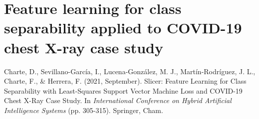 \documentclass[
	fontsize=11pt, %
	twoside=false, %
	open=any, %
	secnumdepth=1, %
]{kaobook}
\begin{document}
%
\renewcommand*{\thechapter}{\Roman{chapter}}
\addtocounter{chapter}{6}
\chapter{Feature learning for class separability applied to COVID-19 chest X-ray case study}

\begin{widepar}
  \begin{kaobox}[frametitle=Source]
    Charte, D., Sevillano-García, I., Lucena-González, M. J., Martín-Rodríguez, J. L., Charte, F., \& Herrera, F. (2021, September). Slicer: Feature Learning for Class Separability with Least-Squares Support Vector Machine Loss and COVID-19 Chest X-Ray Case Study. In \textit{International Conference on Hybrid Artificial Intelligence Systems} (pp. 305-315). Springer, Cham.
\end{kaobox}
\end{widepar}
%
%

%
\end{document}
